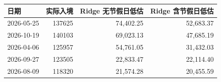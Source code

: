 \begin{tabular}{lrrr}
\toprule
日期 & 实际入境 & Ridge 无节假日低估 & Ridge 含节假日低估 \\
\midrule
2026-05-25 & 137625 & 74,402.25 & 52,683.37 \\
2026-10-19 & 140103 & 69,023.13 & 47,685.19 \\
2026-04-06 & 125957 & 54,761.05 & 31,432.03 \\
2026-09-27 & 123505 & 22,833.47 & 22,114.40 \\
2026-08-09 & 118320 & 21,574.28 & 20,455.59 \\
\bottomrule
\end{tabular}
